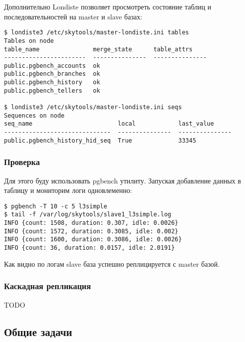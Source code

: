 Дополнительно Londiste позволяет просмотреть состояние таблиц и последовательностей на master и slave базах:

\begin{lstlisting}[label=lst:londiste-replica17,caption=Статус таблиц и последовательностей]
$ londiste3 /etc/skytools/master-londiste.ini tables
Tables on node
table_name               merge_state      table_attrs
-----------------------  ---------------  ---------------
public.pgbench_accounts  ok
public.pgbench_branches  ok
public.pgbench_history   ok
public.pgbench_tellers   ok

$ londiste3 /etc/skytools/master-londiste.ini seqs
Sequences on node
seq_name                        local            last_value
------------------------------  ---------------  ---------------
public.pgbench_history_hid_seq  True             33345
\end{lstlisting}



\subsubsection{Проверка}

Для этого буду использовать pgbench утилиту. Запуская добавление данных в таблицу и мониторим логи одновлеменно:

\begin{lstlisting}[label=lst:londiste-check1,caption=Проверка]
$ pgbench -T 10 -c 5 l3simple
$ tail -f /var/log/skytools/slave1_l3simple.log
INFO {count: 1508, duration: 0.307, idle: 0.0026}
INFO {count: 1572, duration: 0.3085, idle: 0.002}
INFO {count: 1600, duration: 0.3086, idle: 0.0026}
INFO {count: 36, duration: 0.0157, idle: 2.0191}
\end{lstlisting}

Как видно по логам slave база успешно реплицируется с master базой.


\subsubsection{Каскадная репликация}

TODO


\subsection{Общие задачи}

